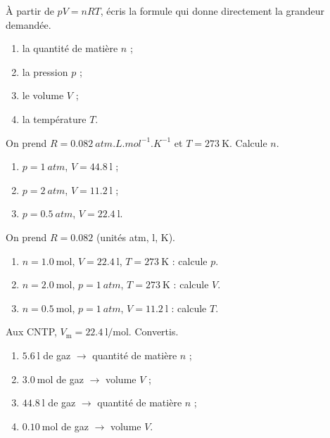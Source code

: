 \documentclass[11pt,a4paper]{article}
\begin{document}
\begin{exo}
À partir de $pV=nRT$, écris la formule qui donne directement la grandeur demandée.
\begin{enumerate}[label=\alph*)]
  \item la quantité de matière $n$ ;
  \item la pression $p$ ;
  \item le volume $V$ ;
  \item la température $T$.
\end{enumerate}
\end{exo}

\begin{exo}
On prend $R=\qty{0.082}{atm.L.mol^{-1}.K^{-1}}$ et $T=\qty{273}{\kelvin}$. Calcule $n$.
\begin{enumerate}[label=\alph*)]
  \item $p=\qty{1}{atm}$, $V=\qty{44.8}{\litre}$ ;
  \item $p=\qty{2}{atm}$, $V=\qty{11.2}{\litre}$ ;
  \item $p=\qty{0.5}{atm}$, $V=\qty{22.4}{\litre}$.
\end{enumerate}
\end{exo}

\begin{exo}[calculer $p$, $V$ ou $T$]
On prend $R=\num{0,082}$ (unités \si{atm}, \si{\litre}, \si{\kelvin}).
\begin{enumerate}[label=\alph*)]
  \item $n=\qty{1.0}{\mole}$, $V=\qty{22.4}{\litre}$, $T=\qty{273}{\kelvin}$ : calcule $p$.
  \item $n=\qty{2.0}{\mole}$, $p=\qty{1}{atm}$, $T=\qty{273}{\kelvin}$ : calcule $V$.
  \item $n=\qty{0.5}{\mole}$, $p=\qty{1}{atm}$, $V=\qty{11.2}{\litre}$ : calcule $T$.
\end{enumerate}
\end{exo}

\begin{exo}
Aux CNTP, $V_{\mathrm{m}}=\qty{22.4}{\litre\per\mole}$. Convertis.
\begin{enumerate}[label=\alph*)]
  \item $\qty{5.6}{\litre}$ de gaz $\to$ quantité de matière $n$ ;
  \item $\qty{3.0}{\mole}$ de gaz $\to$ volume $V$ ;
  \item $\qty{44.8}{\litre}$ de gaz $\to$ quantité de matière $n$ ;
  \item $\qty{0.10}{\mole}$ de gaz $\to$ volume $V$.
\end{enumerate}
\end{exo}
\end{document}
